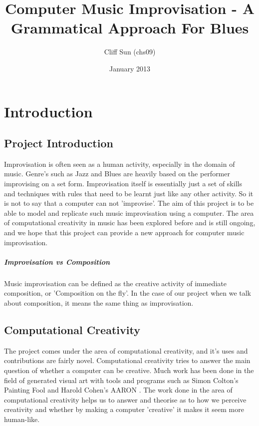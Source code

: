 \documentclass[pdftex,12pt,a4paper]{report}
\begin{document}
\title{Computer Music Improvisation - A Grammatical Approach For Blues}
\author{Cliff Sun (chs09)}
\date{January 2013}
\maketitle


\setcounter{tocdepth}{2} %

\tableofcontents

\pagebreak

\renewcommand*\thesection{\arabic{section}}



\pagebreak

\chapter{Introduction}

\section{Project Introduction}
Improvisation is often seen as a human activity, especially in the domain of music. Genre's such as Jazz and Blues are heavily based on the performer improvising on a set form. Improvisation itself is essentially just a set of skills and techniques with rules that need to be learnt just like any other activity. So it is not to say that a computer can not 'improvise'. The aim of this project is to be able to model and replicate such music improvisation using a computer. The area of computational creativity in music has been explored before and is still ongoing, and we hope that this project can provide a new approach for computer music improvisation.

\paragraph{Improvisation vs Composition}
Music improvisation can be defined as the creative activity of immediate composition, or 'Composition on the fly'. In the case of our project when we talk about composition, it means the same thing as improvisation.

\section{Computational Creativity}
The project comes under the area of computational creativity, and it's uses and contributions are fairly novel. Computational creativity tries to answer the main question of whether a computer can be creative. Much work has been done in the field of generated visual art with tools and programs such as Simon Colton's Painting Fool \cite{website:paintingfool} and Harold Cohen's AARON \cite{website:aaron}. The work done in the area of computational creativity helps us to answer and theorise as to how we perceive creativity and whether by making a computer 'creative' it makes it seem more human-like.
\end{document}
